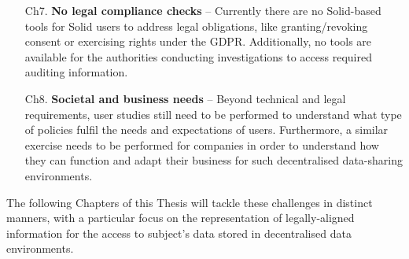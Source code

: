 \begin{enumerate}
    \item [Ch7.] \textbf{No legal compliance checks} -- Currently there are no Solid-based tools for Solid users to address legal obligations, like granting/revoking consent or exercising rights under the GDPR. Additionally, no tools are available for the authorities conducting investigations to access required auditing information.
    \item [Ch8.] \textbf{Societal and business needs} -- Beyond technical and legal requirements, user studies still need to be performed to understand what type of policies fulfil the needs and expectations of users. Furthermore, a similar exercise needs to be performed for companies in order to understand how they can function and adapt their business for such decentralised data-sharing environments.
\end{enumerate}

The following Chapters of this Thesis will tackle these challenges in distinct manners, with a particular focus on the representation of legally-aligned information for the access to subject's data stored in decentralised data environments.